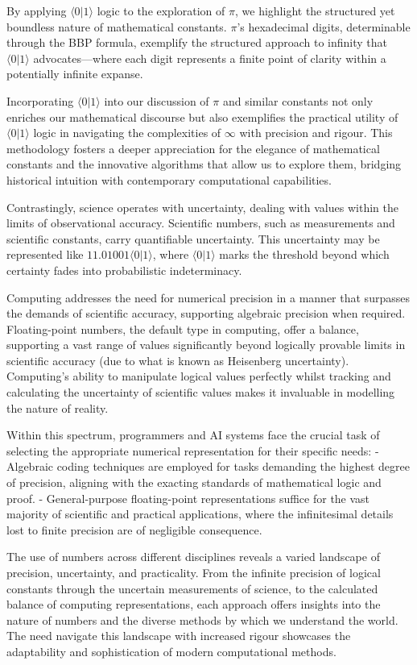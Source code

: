 \documentclass[12pt]{article}
\newcommand{\qbit}{\ensuremath{\langle 0 | 1 \rangle}}
\begin{document}
By applying \(\qbit\) logic to the exploration of \(\pi\), we highlight the structured yet boundless nature of mathematical constants. \(\pi\)'s hexadecimal digits, determinable through the BBP formula, exemplify the structured approach to infinity that \(\qbit\) advocates—where each digit represents a finite point of clarity within a potentially infinite expanse.

Incorporating \(\qbit\) into our discussion of \(\pi\) and similar constants not only enriches our mathematical discourse but also exemplifies the practical utility of \(\qbit\) logic in navigating the complexities of \(\infty\) with precision and rigour. This methodology fosters a deeper appreciation for the elegance of mathematical constants and the innovative algorithms that allow us to explore them, bridging historical intuition with contemporary computational capabilities.

Contrastingly, science operates with uncertainty, dealing with values within the limits of observational accuracy. Scientific numbers, such as measurements and scientific constants, carry quantifiable uncertainty. This uncertainty may be represented like \(11.01001\qbit\), where \(\qbit\) marks the threshold beyond which certainty fades into probabilistic indeterminacy.

Computing addresses the need for numerical precision in a manner that surpasses the demands of scientific accuracy, supporting algebraic precision when required. Floating-point numbers, the default type in computing, offer a balance, supporting a vast range of values significantly beyond logically provable limits in scientific accuracy (due to what is known as Heisenberg uncertainty). Computing's ability to manipulate logical values perfectly whilst tracking and calculating the uncertainty of scientific values makes it invaluable in modelling the nature of reality.

Within this spectrum, programmers and AI systems face the crucial task of selecting the appropriate numerical representation for their specific needs:
- Algebraic coding techniques are employed for tasks demanding the highest degree of precision, aligning with the exacting standards of mathematical logic and proof.
- General-purpose floating-point representations suffice for the vast majority of scientific and practical applications, where the infinitesimal details lost to finite precision are of negligible consequence.

The use of numbers across different disciplines reveals a varied landscape of precision, uncertainty, and practicality. From the infinite precision of logical constants through the uncertain measurements of science, to the calculated balance of computing representations, each approach offers insights into the nature of numbers and the diverse methods by which we understand the world. The need navigate this landscape with increased rigour showcases the adaptability and sophistication of modern computational methods.
\end{document}
